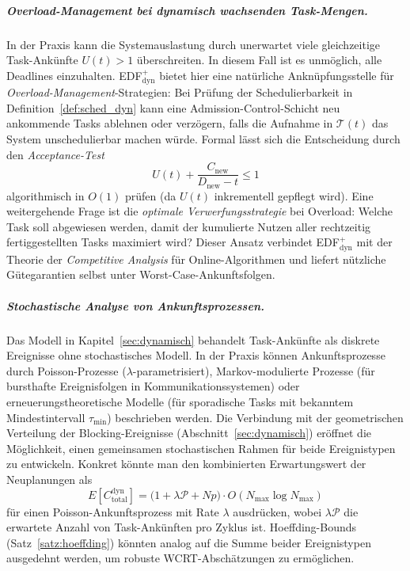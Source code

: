 ﻿\documentclass[a4paper,12pt]{article}
\theoremstyle{definition}
\begin{document}
	\subparagraph{Overload-Management bei dynamisch wachsenden Task-Mengen.}
	In der Praxis kann die Systemauslastung durch unerwartet viele gleichzeitige
	Task-Ankünfte $U(t) > 1$ überschreiten. In diesem Fall ist es unmöglich, alle
	Deadlines einzuhalten. EDF$^+_{\mathrm{dyn}}$ bietet hier eine natürliche
	Anknüpfungsstelle für \emph{Overload-Management}-Strategien: Bei Prüfung der
	Schedulierbarkeit in Definition~\ref{def:sched_dyn} kann eine Admission-Control-Schicht
	neu ankommende Tasks ablehnen oder verzögern, falls die Aufnahme in $\mathcal{T}(t)$
	das System unschedulierbar machen würde. Formal lässt sich die Entscheidung durch
	den \emph{Acceptance-Test}
	\[
		U(t) + \frac{C_{\text{new}}}{D_{\text{new}} - t} \le 1
	\]
	algorithmisch in $O(1)$ prüfen (da $U(t)$ inkrementell gepflegt wird). Eine
	weitergehende Frage ist die \emph{optimale Verwerfungsstrategie} bei Overload:
	Welche Task soll abgewiesen werden, damit der kumulierte Nutzen aller rechtzeitig
	fertiggestellten Tasks maximiert wird? Dieser Ansatz verbindet EDF$^+_{\mathrm{dyn}}$
	mit der Theorie der \emph{Competitive Analysis} für Online-Algorithmen und
	liefert nützliche Gütegarantien selbst unter Worst-Case-Ankunftsfolgen.

	\subparagraph{Stochastische Analyse von Ankunftsprozessen.}
	Das Modell in Kapitel~\ref{sec:dynamisch} behandelt Task-Ankünfte als diskrete
	Ereignisse ohne stochastisches Modell. In der Praxis können Ankunftsprozesse durch
	Poisson-Prozesse ($\lambda$-parametrisiert), Markov-modulierte Prozesse (für
	bursthafte Ereignisfolgen in Kommunikationssystemen) oder erneuerungstheoretische
	Modelle (für sporadische Tasks mit bekanntem Mindestintervall $\tau_{\min}$)
	beschrieben werden. Die Verbindung mit der geometrischen Verteilung der
	Blocking-Ereignisse (Abschnitt~\ref{sec:dynamisch}) eröffnet die Möglichkeit,
	einen gemeinsamen stochastischen Rahmen für beide Ereignistypen zu entwickeln.
	Konkret könnte man den kombinierten Erwartungswert der Neuplanungen als
	\[
		E[C_{\mathrm{total}}^{\mathrm{dyn}}] = \bigl(1 + \lambda\mathcal{P} + Np\bigr)
		\cdot O(N_{\max}\log N_{\max})
	\]
	für einen Poisson-Ankunftsprozess mit Rate $\lambda$ ausdrücken, wobei
	$\lambda\mathcal{P}$ die erwartete Anzahl von Task-Ankünften pro Zyklus ist.
	Hoeffding-Bounds (Satz~\ref{satz:hoeffding}) könnten analog auf die Summe beider
	Ereignistypen ausgedehnt werden, um robuste WCRT-Abschätzungen zu ermöglichen.
\end{document}
